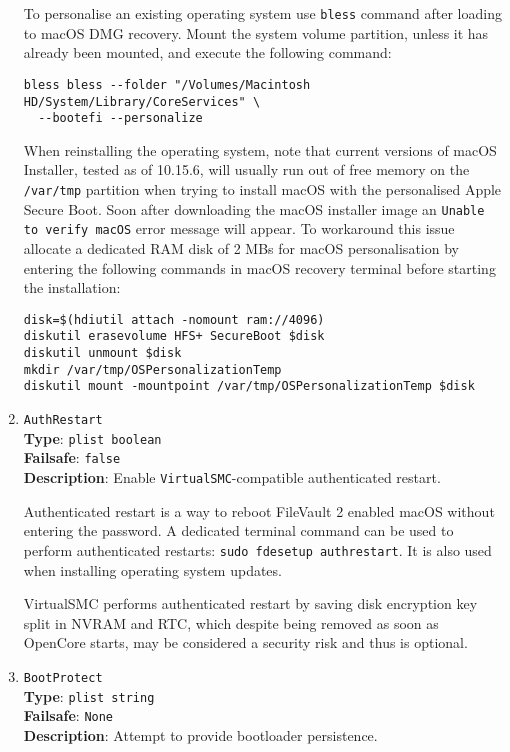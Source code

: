 \documentclass[]{article}
\begin{document}
\begin{enumerate}
  To personalise an existing operating system use \texttt{bless} command
  after loading to macOS DMG recovery. Mount the system volume partition,
  unless it has already been mounted, and execute the following command:

\begin{lstlisting}[label=blesspersona, style=ocbash]
bless bless --folder "/Volumes/Macintosh HD/System/Library/CoreServices" \
  --bootefi --personalize
\end{lstlisting}

  When reinstalling the operating system, note that current versions
  of macOS Installer, tested as of 10.15.6, will usually run out of free memory
  on the \texttt{/var/tmp} partition when trying to install macOS
  with the personalised Apple Secure Boot. Soon after downloading the macOS installer
  image an \texttt{Unable to verify macOS} error message will appear. To workaround
  this issue allocate a dedicated RAM disk of 2 MBs for macOS personalisation
  by entering the following commands in macOS recovery terminal before starting the
  installation:

\begin{lstlisting}[label=secureboot, style=ocbash]
disk=$(hdiutil attach -nomount ram://4096)
diskutil erasevolume HFS+ SecureBoot $disk
diskutil unmount $disk
mkdir /var/tmp/OSPersonalizationTemp
diskutil mount -mountpoint /var/tmp/OSPersonalizationTemp $disk
\end{lstlisting}

\item
  \texttt{AuthRestart}\\
  \textbf{Type}: \texttt{plist\ boolean}\\
  \textbf{Failsafe}: \texttt{false}\\
  \textbf{Description}: Enable \texttt{VirtualSMC}-compatible authenticated restart.

  Authenticated restart is a way to reboot FileVault 2 enabled macOS without entering
  the password. A dedicated terminal command can be used to perform authenticated restarts:
  \texttt{sudo fdesetup authrestart}. It is also used when installing operating system updates.

  VirtualSMC performs authenticated restart by saving disk encryption key split in
  NVRAM and RTC, which despite being removed as soon as OpenCore starts, may be
  considered a security risk and thus is optional.

\item
  \texttt{BootProtect}\\
  \textbf{Type}: \texttt{plist\ string}\\
  \textbf{Failsafe}: \texttt{None}\\
  \textbf{Description}: Attempt to provide bootloader persistence.


\end{enumerate}
\end{document}
